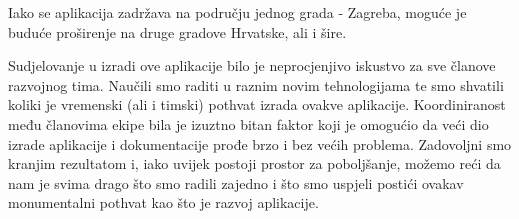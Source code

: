 		Iako se aplikacija zadržava na području jednog grada - Zagreba, moguće je buduće proširenje na druge gradove Hrvatske, ali i šire. 
		
		Sudjelovanje u izradi ove aplikacije bilo je neprocjenjivo iskustvo za sve članove razvojnog tima. Naučili smo raditi u raznim novim tehnologijama te smo shvatili koliki je vremenski (ali i timski) pothvat izrada ovakve aplikacije. Koordiniranost među članovima ekipe bila je izuztno bitan faktor koji je omogućio da veći dio izrade aplikacije i dokumentacije prođe brzo i bez većih problema. Zadovoljni smo kranjim rezultatom i, iako uvijek postoji prostor za poboljšanje, možemo reći da nam je svima drago što smo radili zajedno i što smo uspjeli postići ovakav monumentalni pothvat kao što je razvoj aplikacije.
		
		
		\eject 
